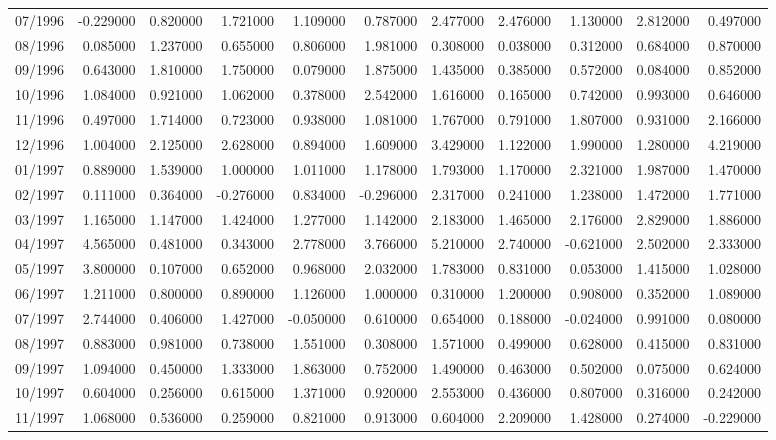 \begin{tabular}{lrrrrrrrrrr}
07/1996 & -0.229000 & 0.820000 & 1.721000 & 1.109000 & 0.787000 & 2.477000 & 2.476000 & 1.130000 & 2.812000 & 0.497000 \\
08/1996 & 0.085000 & 1.237000 & 0.655000 & 0.806000 & 1.981000 & 0.308000 & 0.038000 & 0.312000 & 0.684000 & 0.870000 \\
09/1996 & 0.643000 & 1.810000 & 1.750000 & 0.079000 & 1.875000 & 1.435000 & 0.385000 & 0.572000 & 0.084000 & 0.852000 \\
10/1996 & 1.084000 & 0.921000 & 1.062000 & 0.378000 & 2.542000 & 1.616000 & 0.165000 & 0.742000 & 0.993000 & 0.646000 \\
11/1996 & 0.497000 & 1.714000 & 0.723000 & 0.938000 & 1.081000 & 1.767000 & 0.791000 & 1.807000 & 0.931000 & 2.166000 \\
12/1996 & 1.004000 & 2.125000 & 2.628000 & 0.894000 & 1.609000 & 3.429000 & 1.122000 & 1.990000 & 1.280000 & 4.219000 \\
01/1997 & 0.889000 & 1.539000 & 1.000000 & 1.011000 & 1.178000 & 1.793000 & 1.170000 & 2.321000 & 1.987000 & 1.470000 \\
02/1997 & 0.111000 & 0.364000 & -0.276000 & 0.834000 & -0.296000 & 2.317000 & 0.241000 & 1.238000 & 1.472000 & 1.771000 \\
03/1997 & 1.165000 & 1.147000 & 1.424000 & 1.277000 & 1.142000 & 2.183000 & 1.465000 & 2.176000 & 2.829000 & 1.886000 \\
04/1997 & 4.565000 & 0.481000 & 0.343000 & 2.778000 & 3.766000 & 5.210000 & 2.740000 & -0.621000 & 2.502000 & 2.333000 \\
05/1997 & 3.800000 & 0.107000 & 0.652000 & 0.968000 & 2.032000 & 1.783000 & 0.831000 & 0.053000 & 1.415000 & 1.028000 \\
06/1997 & 1.211000 & 0.800000 & 0.890000 & 1.126000 & 1.000000 & 0.310000 & 1.200000 & 0.908000 & 0.352000 & 1.089000 \\
07/1997 & 2.744000 & 0.406000 & 1.427000 & -0.050000 & 0.610000 & 0.654000 & 0.188000 & -0.024000 & 0.991000 & 0.080000 \\
08/1997 & 0.883000 & 0.981000 & 0.738000 & 1.551000 & 0.308000 & 1.571000 & 0.499000 & 0.628000 & 0.415000 & 0.831000 \\
09/1997 & 1.094000 & 0.450000 & 1.333000 & 1.863000 & 0.752000 & 1.490000 & 0.463000 & 0.502000 & 0.075000 & 0.624000 \\
10/1997 & 0.604000 & 0.256000 & 0.615000 & 1.371000 & 0.920000 & 2.553000 & 0.436000 & 0.807000 & 0.316000 & 0.242000 \\
11/1997 & 1.068000 & 0.536000 & 0.259000 & 0.821000 & 0.913000 & 0.604000 & 2.209000 & 1.428000 & 0.274000 & -0.229000 \\

\end{tabular}

